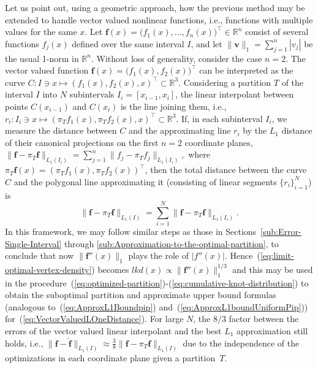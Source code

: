 \documentclass[a4paper,english]{IEEEtran}
\begin{document}
Let us point out, using a geometric approach, how the previous method
may be extended to handle vector valued nonlinear functions, i.e.,
functions with multiple values for the same $x$. Let ${\mathbf{f}}(x)=\bigl(f_{1}(x),\ldots,f_{n}(x)\bigr)^{\top}\in{\mathbb{R}}^{n}$
consist of several functions $f_{j}(x)$ defined over the same interval
$I$, and let $\|{\mathbf{v}}\|_{1}=\sum_{j=\text{1}}^{n}|v_{j}|$ be the usual
1-norm in ${\mathbb{R}}^{n}$. Without loss of generality, consider the case
$n=2$. The vector valued function ${\mathbf{f}}(x)=\bigl(f_{1}(x),f_{2}(x)\bigr)^{\top}$
can be interpreted as the curve $C:I\ni x\mapsto(f_{1}(x),f_{2}(x),x)^{\top}\subset{\mathbb{R}}^{3}$.
Considering a partition $T$ of the interval $I$ into $N$ subintervals
$I_{i}=[x_{i-1},x_{i}]$, the linear interpolant between points $C(x_{i-1})$
and $C(x_{i})$ is the line joining them, i.e., $r_{i}:I_{i}\ni x\mapsto({\pi_{T}} f_{1}(x),{\pi_{T}} f_{2}(x),x)^{\top}\subset{\mathbb{R}}^{3}$.
If, in each subinterval $I_{i}$, we measure the distance between
$C$ and the approximating line $r_{i}$ by the ${L_{1}}$ distance
of their canonical projections on the first $n=2$ coordinate planes,
$\|{\mathbf{f}}-{\pi_{T}}{\mathbf{f}}\|_{{L_{1}}(I_{i})}=\sum_{j=1}^{n}\|f_{j}-{\pi_{T}} f_{j}\|_{{L_{1}}(I_{i})},$
where ${\pi_{T}}{\mathbf{f}}(x)=({\pi_{T}} f_{1}(x),{\pi_{T}} f_{2}(x))^{\top}$, then the
total distance between the curve $C$ and the polygonal line approximating
it (consisting of linear segments $\{r_{i}\}_{i=1}^{N}$) is
\begin{equation}
\|{\mathbf{f}}-{\pi_{T}}{\mathbf{f}}\|_{{L_{1}}(I)}=\sum_{i=1}^{N}\|{\mathbf{f}}-{\pi_{T}}{\mathbf{f}}\|_{{L_{1}}(I_{i})}.\label{eq:VectorValuedLOneDistance}
\end{equation}
In this framework, we may follow similar steps as those in Sections~\ref{sub:Error-Single-Interval}
through \ref{sub:Approximation-to-the-optimal-partition}, to conclude
that now $\|{\mathbf{f}}''(x)\|_{1}$ plays the role of $|f''(x)|$. Hence~(\ref{eq:limit-optimal-vertex-density})
becomes $lkd(x)\propto\|{\mathbf{f}}''(x)\|_{1}^{1/3}$ and this may be used
in the procedure~(\ref{eq:optimized-partition})-(\ref{eq:cumulative-knot-distribution})
to obtain the suboptimal partition and approximate upper bound formulas
(analogous to~(\ref{eq:ApproxL1Boundpip}) and~(\ref{eq:ApproxL1boundUniformPip}))
for~(\ref{eq:VectorValuedLOneDistance}). For large $N$, the $8/3$
factor between the errors of the vector valued linear interpolant
and the best ${L_{1}}$ approximation still holds, i.e., $\|{\mathbf{f}}-\hat{\mathbf{f}}\|_{{L_{1}}(I)}\approx\frac{3}{8}\|{\mathbf{f}}-{\pi_{T}}{\mathbf{f}}\|_{{L_{1}}(I)}$
due to the independence of the optimizations in each coordinate plane
given a partition~${T}$.
\end{document}
